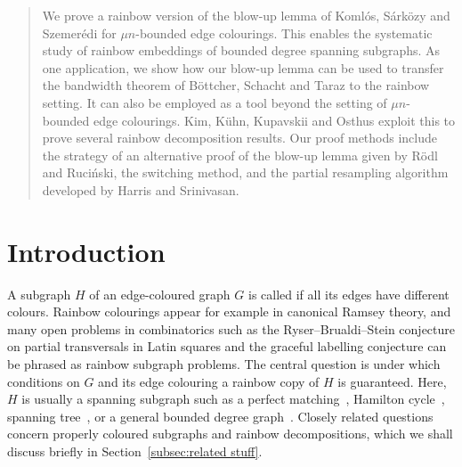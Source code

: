 \documentclass[10pt]{amsart}
\theoremstyle{definition}
\theoremstyle{claimstyle}
\theoremstyle{stepstyle}
\numberwithin{equation}{section}
\begin{document}
\begin{abstract}  \noindent
We prove a rainbow version of the blow-up lemma of Koml\'os, S\'ark\"ozy and Szemer\'edi for $\mu n$-bounded edge colourings.
This enables the systematic study of rainbow embeddings of bounded degree spanning subgraphs.
As one application, we show how our blow-up lemma can be used to transfer the bandwidth theorem of B\"ottcher, Schacht and Taraz to the rainbow setting.
It can also be employed as a tool beyond the setting of $\mu n$-bounded edge colourings.
Kim, K\"uhn, Kupavskii and Osthus exploit this to prove several rainbow decomposition results.
Our proof methods include the strategy of an alternative proof of the blow-up lemma given by R\"odl and Ruci\'nski, the switching method, and the partial resampling algorithm developed by Harris and Srinivasan.
\end{abstract}
%


\maketitle


\section{Introduction} \label{sec:intro}

A subgraph $H$ of an edge-coloured graph $G$ is called  if all its edges have different colours. 
Rainbow colourings appear for example in canonical Ramsey theory, and many open problems in combinatorics such as the Ryser--Brualdi--Stein conjecture on partial transversals in Latin squares and the graceful labelling conjecture can be phrased as rainbow subgraph problems. 
The central question is under which conditions on $G$ and its edge colouring a rainbow copy of $H$ is guaranteed.
Here, $H$ is usually a spanning subgraph such as a perfect matching~\cite{CPS:17,CP:17,HS:08,KY:17,pokrovskiy:16}, Hamilton cycle~\cite{AFR:95,APS:17,BM:17,BPS:17,CPS:17,ENR:83,FR:93,HT:86}, spanning tree~\cite{BLM:17,BPS:17,FK:08,PS:17}, or a general bounded degree graph~\cite{BKP:12,KSV:17,SV:17}.
Closely related questions concern properly coloured subgraphs and rainbow decompositions, which we shall discuss briefly in Section~\ref{subsec:related stuff}.
\end{document}

